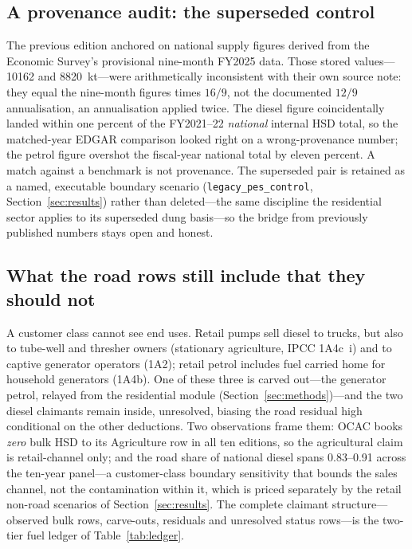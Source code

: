 \subsection{A provenance audit: the superseded control}

The previous edition anchored on national supply figures derived from the Economic
Survey's provisional nine-month FY2025 data. Those stored values---\SI{10162}{} and
\SI{8820}{\kilo\tonne}---were arithmetically inconsistent with their own source note: they
equal the nine-month figures times $16/9$, not the documented $12/9$ annualisation, an
annualisation applied twice. The diesel figure coincidentally landed within one percent of
the FY2021--22 \emph{national} internal HSD total, so the matched-year EDGAR comparison
looked right on a wrong-provenance number; the petrol figure overshot the fiscal-year
national total by eleven percent. A match against a benchmark is not provenance. The
superseded pair is retained as a named, executable boundary scenario
(\texttt{legacy\_pes\_control}, Section~\ref{sec:results}) rather than deleted---the same
discipline the residential sector applies to its superseded dung basis---so the bridge
from previously published numbers stays open and honest.

\subsection{What the road rows still include that they should not}

A customer class cannot see end uses. Retail pumps sell diesel to trucks, but also to
tube-well and thresher owners (stationary agriculture, IPCC 1A4c~i) and to captive
generator operators (1A2); retail petrol includes fuel carried home for household
generators (1A4b). One of these three is carved out---the generator petrol, relayed from
the residential module (Section~\ref{sec:methods})---and the two diesel claimants remain
inside, unresolved, biasing the road residual high conditional on the other deductions.
Two observations frame them: OCAC books \emph{zero} bulk HSD to its Agriculture row in
all ten editions, so the agricultural claim is retail-channel only; and the road share
of national diesel spans 0.83--0.91 across the ten-year panel---a customer-class
boundary sensitivity that bounds the sales channel, not the contamination within it,
which is priced separately by the retail non-road scenarios of
Section~\ref{sec:results}. The complete claimant
structure---observed bulk rows, carve-outs, residuals and unresolved status rows---is
the two-tier fuel ledger of Table~\ref{tab:ledger}.

